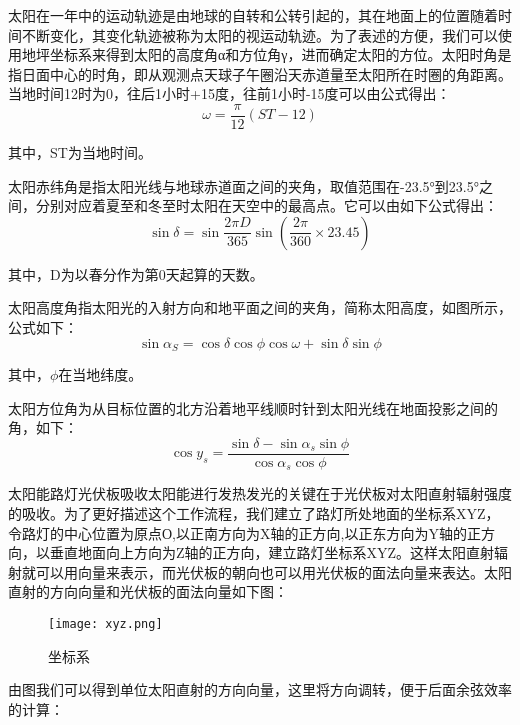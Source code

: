 \documentclass[withoutpreface,bwprint]{cumcmthesis} %
\begin{document}
太阳在一年中的运动轨迹是由地球的自转和公转引起的，其在地面上的位置随着时间不断变化，其变化轨迹被称为太阳的视运动轨迹。为了表述的方便，我们可以使用地坪坐标系来得到太阳的高度角α和方位角γ，进而确定太阳的方位。太阳时角是指日面中心的时角，即从观测点天球子午圈沿天赤道量至太阳所在时圈的角距离。当地时间12时为0，往后1小时+15度，往前1小时-15度可以由公式得出：
\begin{equation}
	\omega = \frac{\pi}{12}(ST - 12)
	\label{eq:002}
\end{equation}

其中，ST为当地时间。

太阳赤纬角是指太阳光线与地球赤道面之间的夹角，取值范围在-23.5°到23.5°之间，分别对应着夏至和冬至时太阳在天空中的最高点。它可以由如下公式得出：
\begin{equation}
	\sin\delta = \sin \frac{{2}\pi D}{365}\sin\left(\frac{2\pi}{360} \times 23.45\right)
	\label{eq:003}
\end{equation}

其中，D为以春分作为第0天起算的天数。

太阳高度角指太阳光的入射方向和地平面之间的夹角，简称太阳高度，如图所示，公式如下：
\begin{equation}
	\sin\alpha_{S} = \cos \delta \cos \phi \cos \omega + \sin \delta \sin \phi
	\label{eq:004}
\end{equation}

其中，$\phi$在当地纬度。

太阳方位角为从目标位置的北方沿着地平线顺时针到太阳光线在地面投影之间的角，如下：
\begin{equation}
	\cos y_{s} = \frac{ \sin \delta - \sin \alpha_{s} \sin \phi}{\cos \alpha_{s}\cos \phi}
	\label{eq:004}
\end{equation}

太阳能路灯光伏板吸收太阳能进行发热发光的关键在于光伏板对太阳直射辐射强度的吸收。为了更好描述这个工作流程，我们建立了路灯所处地面的坐标系XYZ，令路灯的中心位置为原点О,以正南方向为X轴的正方向,以正东方向为Y轴的正方向，以垂直地面向上方向为Z轴的正方向，建立路灯坐标系XYZ。这样太阳直射辐射就可以用向量来表示，而光伏板的朝向也可以用光伏板的面法向量来表达。太阳直射的方向向量和光伏板的面法向量如下图：

\begin{figure}[!h]
	\centering
	\texttt{[image: xyz.png]}
	\caption{坐标系}
	\label{fig:002}
\end{figure}

由图我们可以得到单位太阳直射的方向向量，这里将方向调转，便于后面余弦效率的计算：
\end{document}
